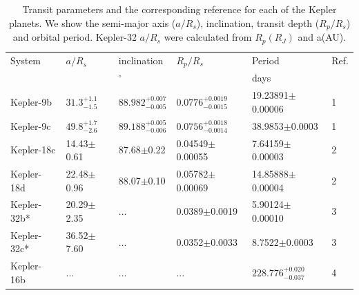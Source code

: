 
\begin{table}
\caption{Transit parameters and the corresponding reference for each of the Kepler planets. We show the semi-major axis ($a/R_s$), inclination, transit depth ($R_p/R_s$) and orbital period. Kepler-32 $a/R_s$ were calculated from $R_p(R_J)$ and a(AU). \label{P4:tab:transit}}
\centering
\begin{tabular}{llllll}
    \hline\hline
    System & $a/R_s$ & inclination & $R_p/R_s$ & Period & Ref. \\
     &  & $^{\circ}$ &  & days &  \\
    \hline
    Kepler-9b &  $31.3^{+1.1}_{-1.5}$  & $88.982^{+0.007}_{-0.005}$  &  $0.0776^{+0.0019}_{-0.0015}$ & 19.23891$\pm$0.00006 & 1 \\
    Kepler-9c &  $49.8^{+1.7}_{-2.6}$  & $89.188^{+0.005}_{-0.006}$  &  $0.0756^{+0.0018}_{-0.0014}$ & 38.9853$\pm$0.0003 & 1 \\
    Kepler-18c &  14.43$\pm$0.61  & 	87.68$\pm$0.22  &  0.04549$\pm$0.00055 & 7.64159$\pm$0.00003 & 2 \\
    Kepler-18d &  22.48$\pm$0.96  & 	88.07$\pm$0.10  &  0.05782$\pm$0.00069 & 	14.85888$\pm$0.00004 & 2 \\
    Kepler-32b* &  20.29$\pm$2.35 &  ... & 0.0389$\pm$0.0019 & 5.90124$\pm$0.00010	 & 3 \\
    Kepler-32c* &  36.52$\pm$7.60 &  ... & 0.0352$\pm$0.0033 & 8.7522$\pm$0.0003 & 3 \\
    Kepler-16b & ... & ... & ... & $228.776_{-0.037}^{+0.020}$ & 4 \\
    \hline
\end{tabular}
\end{table}


